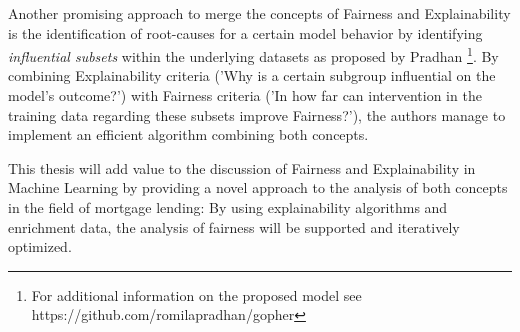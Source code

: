 




Another promising approach to merge the concepts of Fairness and Explainability is the identification of root-causes for a certain model behavior by identifying \textit{influential subsets} within the underlying datasets as proposed by Pradhan \parencite{Pradhan2022}\footnote{For additional information on the proposed model see https://github.com/romilapradhan/gopher}.
By combining Explainability criteria ('Why is a certain subgroup influential on the model's outcome?') with Fairness criteria ('In how far can intervention in the training data regarding these subsets improve Fairness?'), the authors manage to implement an efficient algorithm combining both concepts.


This thesis will add value to the discussion of Fairness and Explainability in Machine Learning by providing a novel approach to the analysis of both concepts in the field of mortgage lending: 
By using explainability algorithms and enrichment data, the analysis of fairness will be supported and iteratively optimized.